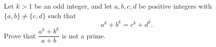 Let $k>1$ be an odd integer, and let $a,b,c,d$ be positive integers with $\{a,b\}\ne\{c,d\}$ such that
\[
a^k+b^k=c^k+d^k .
\]
Prove that $\dfrac{a^k+b^k}{a+b}$ is not a prime.
